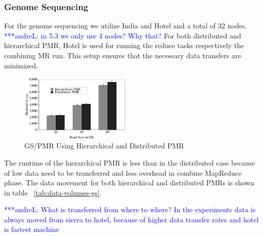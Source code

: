 \documentclass{acm_proc_article-sp}
\newcommand{\alnote}[1]{ {\textcolor{blue} { ***andreL: #1 }}}
\newcommand{\pnote}[1]{ {\textcolor{magenta} { ***pradeep: #1 }}}
\newcommand{\alnote}[1]{}
\newcommand{\pnote}[1]{}
\begin{document}
\subsubsection*{Genome Sequencing}
For the genome sequencing we utilize India and Hotel and a total of 32 nodes.
\alnote{in 5.3 we only use 4 nodes? Why that?} For both distributed and
hierarchical PMR, Hotel is used for running the reduce tasks respectively the
combining MR run. This setup ensures that the necessary data transfers are
minimized.



\begin{figure}[ht]
	\centering
		\includegraphics[width=0.47\textwidth]{figures/gs_hihmr_dpmr.pdf}
\caption{GS/PMR Using Hierarchical and Distributed PMR} 	
\label{fig:gs_hihmr_dpmr}
\end{figure}		


The runtime of the hierarchical PMR is less than in the distributed case
because of low data need to be transferred and less overhead in combine
MapReduce phase. The data movement for both hierarchical and distributed PMRs is
shown in table ~\ref{tab:data-volumes-gs}.

\alnote{What is transferred from where to where? In the experiments data is always moved from sierra to hotel, because of higher data transfer rates and hotel is fastest machine}
\end{document}
